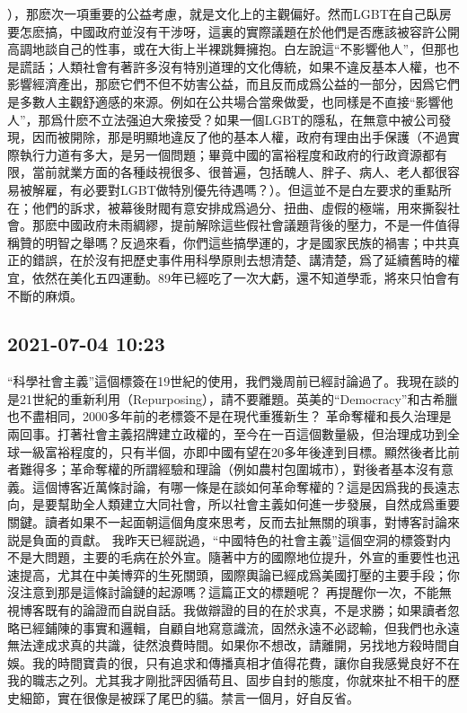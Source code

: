 \documentclass[twocolumn]{ctexart}
\begin{document}
），那麽次一項重要的公益考慮，就是文化上的主觀偏好。然而LGBT在自己臥房要怎麽搞，中國政府並沒有干涉呀，這裏的實際議題在於他們是否應該被容許公開高調地談自己的性事，或在大街上半裸跳舞擁抱。白左說這“不影響他人”，但那也是謊話；人類社會有著許多沒有特別道理的文化傳統，如果不違反基本人權，也不影響經濟產出，那麽它們不但不妨害公益，而且反而成爲公益的一部分，因爲它們是多數人主觀舒適感的來源。例如在公共場合當衆做愛，也同樣是不直接“影響他人”，那爲什麽不立法强迫大衆接受？如果一個LGBT的隱私，在無意中被公司發現，因而被開除，那是明顯地違反了他的基本人權，政府有理由出手保護（不過實際執行力道有多大，是另一個問題；畢竟中國的富裕程度和政府的行政資源都有限，當前就業方面的各種歧視很多、很普遍，包括醜人、胖子、病人、老人都很容易被解雇，有必要對LGBT做特別優先待遇嗎？）。但這並不是白左要求的重點所在；他們的訴求，被幕後財閥有意安排成爲過分、扭曲、虛假的極端，用來撕裂社會。那麽中國政府未雨綢繆，提前解除這些假社會議題背後的壓力，不是一件值得稱贊的明智之舉嗎？反過來看，你們這些搞學運的，才是國家民族的禍害；中共真正的錯誤，在於沒有把歷史事件用科學原則去想清楚、講清楚，爲了延續舊時的權宜，依然在美化五四運動。89年已經吃了一次大虧，還不知道學乖，將來只怕會有不斷的麻煩。\subsection*{2021-07-04 10:23}

“科學社會主義”這個標簽在19世紀的使用，我們幾周前已經討論過了。我現在談的是21世紀的重新利用（Repurposing），請不要離題。英美的“Democracy”和古希臘也不盡相同，2000多年前的老標簽不是在現代重獲新生？
革命奪權和長久治理是兩回事。打著社會主義招牌建立政權的，至今在一百這個數量級，但治理成功到全球一級富裕程度的，只有半個，亦即中國有望在20多年後達到目標。顯然後者比前者難得多；革命奪權的所謂經驗和理論（例如農村包圍城市），對後者基本沒有意義。這個博客近萬條討論，有哪一條是在談如何革命奪權的？這是因爲我的長遠志向，是要幫助全人類建立大同社會，所以社會主義如何進一步發展，自然成爲重要關鍵。讀者如果不一起面朝這個角度來思考，反而去扯無關的瑣事，對博客討論來説是負面的貢獻。
我昨天已經説過，“中國特色的社會主義”這個空洞的標簽對内不是大問題，主要的毛病在於外宣。隨著中方的國際地位提升，外宣的重要性也迅速提高，尤其在中美博弈的生死關頭，國際輿論已經成爲美國打壓的主要手段；你沒注意到那是這條討論鏈的起源嗎？這篇正文的標題呢？
再提醒你一次，不能無視博客既有的論證而自説自話。我做辯證的目的在於求真，不是求勝；如果讀者忽略已經鋪陳的事實和邏輯，自顧自地寫意識流，固然永遠不必認輸，但我們也永遠無法達成求真的共識，徒然浪費時間。如果你不想改，請離開，另找地方殺時間自娛。我的時間寶貴的很，只有追求和傳播真相才值得花費，讓你自我感覺良好不在我的職志之列。尤其我才剛批評因循苟且、固步自封的態度，你就來扯不相干的歷史細節，實在很像是被踩了尾巴的貓。禁言一個月，好自反省。
\end{document}
